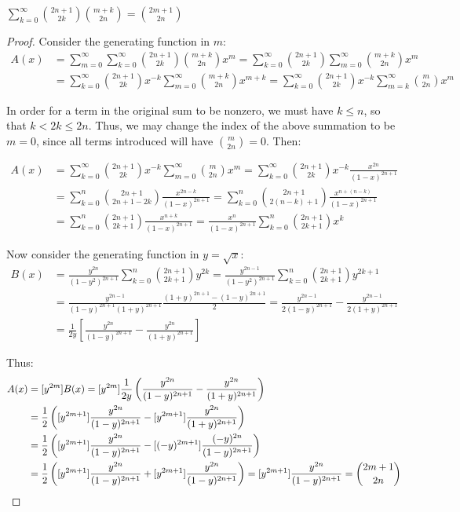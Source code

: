 \documentclass[a4paper]{article}
\begin{document}
\begin{example}
$\displaystyle\sum_{k=0}^\infty\binom{2n+1}{2k}\binom{m+k}{2n}=\binom{2m+1}{2n}$

\begin{hl}
\begin{proof}
Consider the generating function in $m$:
\begin{align*}
A(x)
&=\sum_{m=0}^\infty\sum_{k=0}^\infty\binom{2n+1}{2k}\binom{m+k}{2n}x^m
=\sum_{k=0}^\infty\binom{2n+1}{2k}\sum_{m=0}^\infty\binom{m+k}{2n}x^m\\
&=\sum_{k=0}^\infty\binom{2n+1}{2k}x^{-k}\sum_{m=0}^\infty\binom{m+k}{2n}x^{m+k}
=\sum_{k=0}^\infty\binom{2n+1}{2k}x^{-k}\sum_{m=k}^\infty\binom{m}{2n}x^{m}
\end{align*}

In order for a term in the original sum to be nonzero, we must have $k\leq n$, so that $k<2k\leq 2n$. Thus, we may change the index of the above summation to be $m=0$, since all terms introduced will have $\binom m{2n}=0$. Then:

\begin{align*}
A(x)
&=\sum_{k=0}^\infty\binom{2n+1}{2k}x^{-k}\sum_{m=0}^\infty\binom{m}{2n}x^{m}
=\sum_{k=0}^\infty\binom{2n+1}{2k}x^{-k}\frac{x^{2n}}{(1-x)^{2n+1}}\\
&=\sum_{k=0}^n\binom{2n+1}{2n+1-2k}\frac{x^{2n-k}}{(1-x)^{2n+1}}
=\sum_{k=0}^n\binom{2n+1}{2(n-k)+1}\frac{x^{n+(n-k)}}{(1-x)^{2n+1}}\\
&=\sum_{k=0}^n\binom{2n+1}{2k+1}\frac{x^{n+k}}{(1-x)^{2n+1}}
=\frac{x^n}{(1-x)^{2n+1}}\sum_{k=0}^n\binom{2n+1}{2k+1}x^k
\end{align*}

Now consider the generating function in $y=\sqrt x$:
\begin{align*}
B(x)
&=\frac{y^{2n}}{(1-y^2)^{2n+1}}\sum_{k=0}^n\binom{2n+1}{2k+1}y^{2k}
=\frac{y^{2n-1}}{(1-y^2)^{2n+1}}\sum_{k=0}^n\binom{2n+1}{2k+1}y^{2k+1}\\
&=\frac{y^{2n-1}}{(1-y)^{2n+1}(1+y)^{2n+1}}\frac{(1+y)^{2n+1}-(1-y)^{2n+1}}2
=\frac{y^{2n-1}}{2(1-y)^{2n+1}}-\frac{y^{2n-1}}{2(1+y)^{2n+1}}\\
&=\frac1{2y}\left[\frac{y^{2n}}{(1-y)^{2n+1}}-\frac{y^{2n}}{(1+y)^{2n+1}}\right]
\end{align*}

Thus:
\begin{align*}
[x^m]A(x)
&=[y^{2m}]B(x)
=[y^{2m}]\frac1{2y}\left(\frac{y^{2n}}{(1-y)^{2n+1}}-\frac{y^{2n}}{(1+y)^{2n+1}}\right)\\
&=\frac12\left([y^{2m+1}]\frac{y^{2n}}{(1-y)^{2n+1}}-[y^{2m+1}]\frac{y^{2n}}{(1+y)^{2n+1}}\right)\\
&=\frac12\left([y^{2m+1}]\frac{y^{2n}}{(1-y)^{2n+1}}-[(-y)^{2m+1}]\frac{(-y)^{2n}}{(1-y)^{2n+1}}\right)\\
&=\frac12\left([y^{2m+1}]\frac{y^{2n}}{(1-y)^{2n+1}}+[y^{2m+1}]\frac{y^{2n}}{(1-y)^{2n+1}}\right)
=[y^{2m+1}]\frac{y^{2n}}{(1-y)^{2n+1}}
=\binom{2m+1}{2n}\qedhere
\end{align*}
\end{proof}
\end{hl}
\end{example}
\end{document}
